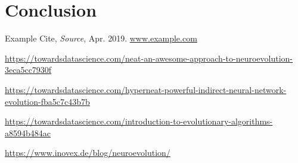 \documentclass[journal, a4paper]{IEEEtran}
\begin{document}

\section{Conclusion}

\blindtext




\begin{thebibliography}{5}

    Example Cite, {\em Source}, Apr. 2019.
    \url{www.example.com}
    
    \url{https://towardsdatascience.com/neat-an-awesome-approach-to-neuroevolution-3eca5cc7930f}
  
    \url{https://towardsdatascience.com/hyperneat-powerful-indirect-neural-network-evolution-fba5c7c43b7b}
  
    \url{https://towardsdatascience.com/introduction-to-evolutionary-algorithms-a8594b484ac}
  
    \url{https://www.inovex.de/blog/neuroevolution/}

\end{thebibliography}
\end{document}
